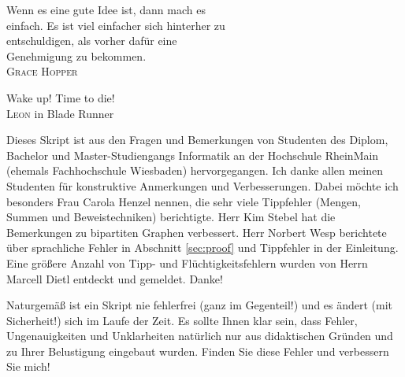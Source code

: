 \documentclass[11pt, a4paper, twoside, bibliography=totoc]{scrartcl}
\begin{document}
\begin{raggedleft}
Wenn es eine gute Idee ist, dann mach es\\ 
einfach. Es ist viel einfacher sich hinterher zu\\
entschuldigen, als vorher dafür eine\\
Genehmigung zu bekommen.\\[\smallskipamount]
\hfill \textsc{Grace Hopper}%
\end{raggedleft}

\vspace*{1.5cm}

\begin{raggedleft}
Wake up! Time to die!\\[\smallskipamount]
\hfill \textsc{Leon} in Blade Runner%
\end{raggedleft}

\vfill

Dieses Skript ist aus den Fragen und Bemerkungen von Studenten des
Diplom, Bachelor und Master-Studiengangs Informatik an der Hochschule
RheinMain (ehemals Fachhochschule Wiesbaden) hervorgegangen. Ich danke
allen meinen Studenten für konstruktive Anmerkungen und
Verbesserungen. Dabei möchte ich besonders Frau Carola Henzel nennen,
die sehr viele Tippfehler (Mengen, Summen und Beweistechniken)
berichtigte. Herr Kim Stebel hat die Bemerkungen zu bipartiten Graphen
verbessert. Herr Norbert Wesp berichtete über sprachliche Fehler in
Abschnitt \ref{sec:proof} und Tippfehler in der Einleitung. Eine größere 
Anzahl von Tipp- und Flüchtigkeitsfehlern wurden von Herrn Marcell Dietl
entdeckt und gemeldet. Danke!

Naturgemäß ist ein Skript nie fehlerfrei (ganz im Gegenteil!) und es
ändert (mit Sicherheit!) sich im Laufe der Zeit. Es sollte Ihnen klar 
sein, dass Fehler, Ungenauigkeiten und Unklarheiten natürlich nur 
aus didaktischen Gründen und zu Ihrer  Belustigung eingebaut 
wurden. Finden Sie diese Fehler und verbessern Sie mich!

\cleardoublepage

\tableofcontents

\cleardoublepage

\pagestyle{scrheadings}

	


\end{document}
